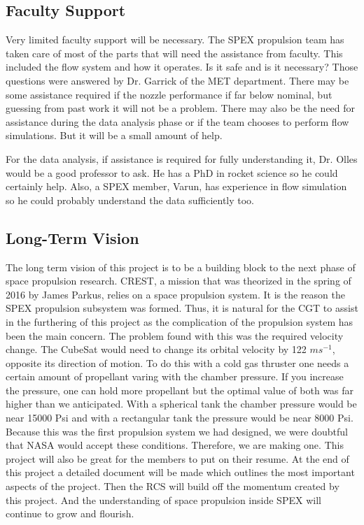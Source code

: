 \documentclass[conference]{IEEEtran} %
\begin{document}
\subsection{Faculty Support}
Very limited faculty support will be necessary. The SPEX propulsion team has taken care of most of the parts that will need the assistance from faculty.
This included the flow system and how it operates. Is it safe and is it necessary? Those questions were answered by Dr. Garrick of the MET department.
There may be some assistance required if the nozzle performance if far below nominal, but guessing from past work it will not be a problem. There may also
be the need for assistance during the data analysis phase or if the team chooses to perform flow simulations. But it will be a small amount of help.

For the data analysis, if assistance is required for fully understanding it, Dr. Olles would be a good professor to ask. He has a PhD in rocket science
so he could certainly help. Also, a SPEX member, Varun, has experience in flow simulation so he could probably understand the data sufficiently too.
\subsection{Long-Term Vision}
\label{sec:vision}

The long term vision of this project is to be a building block to the next phase of space propulsion research. CREST, a mission that was theorized in the
spring of 2016 by James Parkus, relies on a space propulsion system. It is the reason the SPEX propulsion subsystem was formed. Thus, it is natural for the
CGT to assist in the furthering of this project as the complication of the propulsion system has been the main concern. The problem found with this was the required velocity change.
The CubeSat would need to change its orbital velocity by 122 $ms^{-1}$, opposite its direction of motion. To do this with a cold gas thruster one needs a certain amount
of propellant varing with the chamber pressure. If you increase the pressure, one can hold more propellant but the optimal value of both was far higher than we anticipated.
With a spherical tank the chamber pressure would be near 15000 Psi and with a rectangular tank the pressure would be near 8000 Psi. Because this was the first propulsion system
we had designed, we were doubtful that NASA would accept these conditions. Therefore, we are making one. This project will also be great for
the members to put on their resume. At the end of this project a detailed document will be made which outlines the most important aspects of the project.
Then the RCS will build off the momentum created by this project. And the understanding of space propulsion inside SPEX will continue to grow and flourish.
\end{document}
